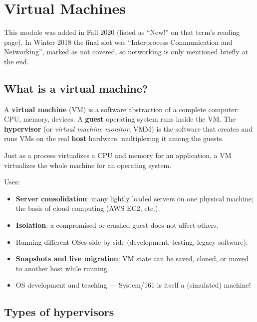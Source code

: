 \chapter{Virtual Machines}

\begin{aside}
This module was added in Fall 2020 (listed as ``New!'' on that term's reading page). In Winter
2018 the final slot was ``Interprocess Communication and Networking'', marked as not covered, so
networking is only mentioned briefly at the end.
\end{aside}

\section{What is a virtual machine?}

\begin{definition}
A \textbf{virtual machine} (VM) is a software abstraction of a complete computer: CPU, memory,
devices. A \textbf{guest} operating system runs inside the VM. The \textbf{hypervisor} (or
\emph{virtual machine monitor}, VMM) is the software that creates and runs VMs on the real
\textbf{host} hardware, multiplexing it among the guests.
\end{definition}

Just as a process virtualizes a CPU and memory for an application, a VM virtualizes the whole
machine for an operating system.

Uses:
\begin{itemize}
  \item \textbf{Server consolidation}: many lightly loaded servers on one physical machine;
    the basis of cloud computing (AWS EC2, etc.).
  \item \textbf{Isolation}: a compromised or crashed guest does not affect others.
  \item Running different OSes side by side (development, testing, legacy software).
  \item \textbf{Snapshots and live migration}: VM state can be saved, cloned, or moved to
    another host while running.
  \item OS development and teaching --- System/161 is itself a (simulated) machine!
\end{itemize}

\section{Types of hypervisors}

